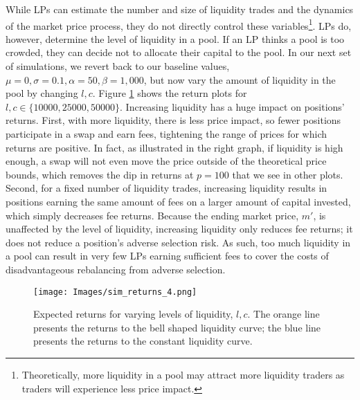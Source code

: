 \documentclass[11pt]{article}
\begin{document}
While LPs can estimate the number and size of liquidity trades and the dynamics of the market price process, they do not directly control these variables\footnote{Theoretically, more liquidity in a pool may attract more liquidity traders as traders will experience less price impact.}. LPs do, however, determine the level of liquidity in a pool. If an LP thinks a pool is too crowded, they can decide not to allocate their capital to the pool. In our next set of simulations, we revert back to our baseline values, $\mu = 0, \sigma = 0.1, \alpha = 50, \beta = 1,000$, but now vary the amount of liquidity in the pool by changing $l, c$. Figure \ref{fig:sim_returns_4} shows the return plots for $l, c \in \{ 10000, 25000, 50000 \}$. Increasing liquidity has a huge impact on positions' returns. First, with more liquidity, there is less price impact, so fewer positions participate in a swap and earn fees, tightening the range of prices for which returns are positive. In fact, as illustrated in the right graph, if liquidity is high enough, a swap will not even move the price outside of the theoretical price bounds, which removes the dip in returns at $p=100$ that we see in other plots. Second, for a fixed number of liquidity trades, increasing liquidity results in positions earning the same amount of fees on a larger amount of capital invested, which simply decreases fee returns. Because the ending market price, $m'$, is unaffected by the level of liquidity, increasing liquidity only reduces fee returns; it does not reduce a position's adverse selection risk. As such, too much liquidity in a pool can result in very few LPs earning sufficient fees to cover the costs of disadvantageous rebalancing from adverse selection.

\begin{figure}[H]
    \centering
    \texttt{[image: Images/sim\_returns\_4.png]}
    \caption{Expected returns for varying levels of liquidity, $l, c$. The orange line presents the returns to the bell shaped liquidity curve; the blue line presents the returns to the constant liquidity curve.}
    \label{fig:sim_returns_4}
\end{figure}
\end{document}
